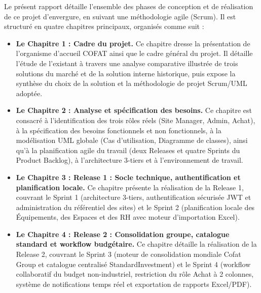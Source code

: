 Le présent rapport détaille l'ensemble des phases de conception et de réalisation de ce projet d'envergure, en suivant une méthodologie agile (Scrum). Il est structuré en quatre chapitres principaux, organisés comme suit :

\begin{itemize}
    \item \textbf{Le Chapitre 1 : Cadre du projet.} Ce chapitre dresse la présentation de l'organisme d'accueil COFAT ainsi que le cadre général du projet. Il détaille l'étude de l'existant à travers une analyse comparative illustrée de trois solutions du marché et de la solution interne historique, puis expose la synthèse du choix de la solution et la méthodologie de projet Scrum/UML adoptée.
    \item \textbf{Le Chapitre 2 : Analyse et spécification des besoins.} Ce chapitre est consacré à l'identification des trois rôles réels (Site Manager, Admin, Achat), à la spécification des besoins fonctionnels et non fonctionnels, à la modélisation UML globale (Cas d'utilisation, Diagramme de classes), ainsi qu'à la planification agile du travail (deux Releases et quatre Sprints du Product Backlog), à l'architecture 3-tiers et à l'environnement de travail.
    \item \textbf{Le Chapitre 3 : Release 1 : Socle technique, authentification et planification locale.} Ce chapitre présente la réalisation de la Release 1, couvrant le Sprint 1 (architecture 3-tiers, authentification sécurisée JWT et administration du référentiel des sites) et le Sprint 2 (planification locale des Équipements, des Espaces et des RH avec moteur d'importation Excel).
    \item \textbf{Le Chapitre 4 : Release 2 : Consolidation groupe, catalogue standard et workflow budgétaire.} Ce chapitre détaille la réalisation de la Release 2, couvrant le Sprint 3 (moteur de consolidation mondiale Cofat Group et catalogue centralisé StandardInvestment) et le Sprint 4 (workflow collaboratif du budget non-industriel, restriction du rôle Achat à 2 colonnes, système de notifications temps réel et exportation de rapports Excel/PDF).
\end{itemize}
